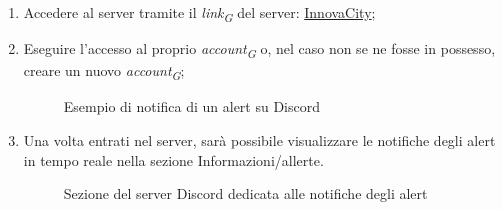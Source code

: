 \begin{enumerate}
    \item Accedere al server tramite il \textit{link}\textsubscript{\textit{G}} del server: \href{https://discord.gg/9VZ8me7x}{InnovaCity};
    \item Eseguire l'accesso al proprio \textit{account}\textsubscript{\textit{G}} o, nel caso non se ne fosse in possesso, creare un nuovo \textit{account}\textsubscript{\textit{G}};
    \begin{figure}[H]
        \centering
        \caption{Esempio di notifica di un alert su Discord}
        \label{fig:my_label}
    \end{figure}
    \item Una volta entrati nel server, sarà possibile visualizzare le notifiche degli alert in tempo reale nella sezione Informazioni/allerte. 
    \begin{figure}[H]
        \centering
        \caption{Sezione del server Discord dedicata alle notifiche degli alert}    
        \label{fig:my_label}
    \end{figure}
\end{enumerate}


